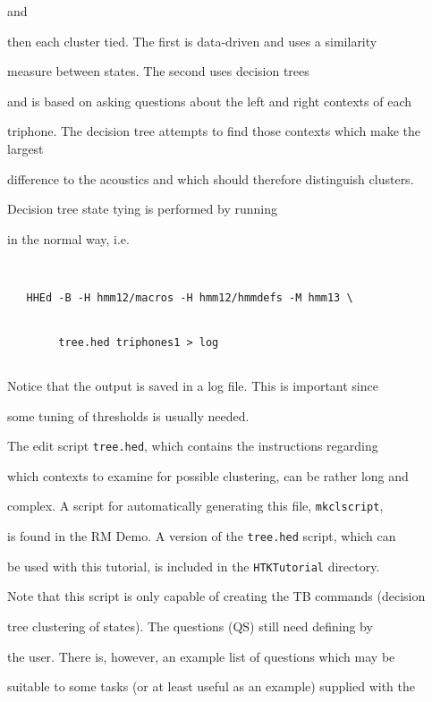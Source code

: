 and


then each cluster tied.  The first is data-driven and uses a similarity


measure between states.  The second uses decision trees


and is based on asking questions about the left and right contexts of each


triphone.  The decision tree attempts to find those contexts which make the largest


difference to the acoustics and which should therefore distinguish clusters.





Decision tree state tying is performed by running  


in the normal way, i.e.


\begin{verbatim}


   HHEd -B -H hmm12/macros -H hmm12/hmmdefs -M hmm13 \


        tree.hed triphones1 > log


\end{verbatim}


Notice that the output is saved in a log file.  This is important since


some tuning of thresholds is usually needed.





The edit script \texttt{tree.hed}, which contains the instructions regarding


which contexts to examine for possible clustering, can be rather long and


complex. A script for automatically generating this file, \texttt{mkclscript},


is found in the RM Demo. A version of the \texttt{tree.hed} script, which can


be used with this tutorial, is included in the \texttt{HTKTutorial} directory.


Note that this script is only capable of creating the TB commands (decision 


tree clustering of states).  The questions (QS) still need defining by


the user.  There is, however, an example list of questions which may be 


suitable to some tasks (or at least useful as an example) supplied with the 



